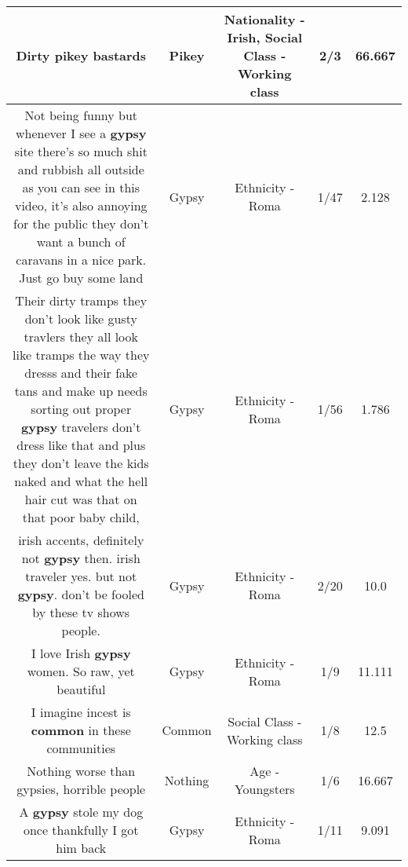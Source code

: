 \documentclass[11pt]{article}
\newlength\mylength
\begin{document}
\begin{center}
\begin{longtable}{|C{.65\mylength}|C{.30\mylength}|C{.12\mylength}|C{.12\mylength}|C{.12\mylength}|}
  \small Dirty \textbf{p\textbf{ikey}} bastards\normalsize   & Pikey & Nationality - Irish, Social Class - Working class & 2/3 & 66.667 \\  \hline
  \small Not being funny but whenever I see a \textbf{gypsy} site there's so much shit and rubbish all outside as you can see in this video, it's also annoying for the public they don't want a bunch of caravans in a nice park. Just go buy some land\normalsize   & Gypsy & Ethnicity - Roma & 1/47 & 2.128 \\  \hline
  \small Their dirty tramps they don't look like gusty travlers they all look like tramps the way they dresss and their fake tans and make up needs sorting out proper \textbf{gypsy} travelers don't dress like that and plus they don't leave the kids naked and what the hell hair cut was that on that poor baby child,\normalsize   & Gypsy & Ethnicity - Roma & 1/56 & 1.786 \\  \hline
  \small irish accents, definitely not \textbf{gypsy} then. irish traveler yes. but not \textbf{gypsy}. don't be fooled by these tv shows people.\normalsize   & Gypsy & Ethnicity - Roma & 2/20 & 10.0 \\  \hline
  \small I love  Irish \textbf{gypsy} women. So raw, yet beautiful\normalsize   & Gypsy & Ethnicity - Roma & 1/9 & 11.111 \\  \hline
  \small I imagine incest is \textbf{common} in these communities\normalsize   & Common & Social Class - Working class & 1/8 & 12.5 \\  \hline
  \small Nothing worse than gypsies, horrible people\normalsize   & Nothing & Age - Youngsters & 1/6 & 16.667 \\  \hline
  \small A \textbf{gypsy} stole my dog once thankfully I got him back\normalsize   & Gypsy & Ethnicity - Roma & 1/11 & 9.091 \\  \hline

\end{longtable}
\end{center}
\end{document}
